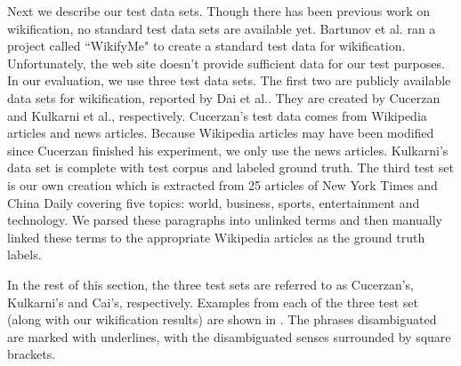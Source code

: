 Next we describe our test data sets.
Though there has been previous work on wikification,
no standard test data sets are available yet.
Bartunov et al.\cite{bartunov2011wikifyme} ran a project called
``WikifyMe" to create a standard test data for wikification.
Unfortunately, the web site doesn't provide sufficient data for our
test purposes.
In our evaluation, we use three test data sets.
The first two are publicly available data sets for wikification,
reported by Dai et al.\cite{daientity}.
They are created by Cucerzan\cite{cucerzan2007large} and
Kulkarni et al.\cite{kulkarni2009collective}, respectively.
Cucerzan's test data comes from
Wikipedia articles and news articles.
Because Wikipedia articles may have been modified
since Cucerzan finished his experiment, we only use the news articles.
Kulkarni's data set is complete with test corpus and labeled ground
truth.  The third test set is our own creation which is extracted from
25 articles of New York Times and China Daily covering five topics:
world, business, sports, entertainment and technology.
We parsed these paragraphs into unlinked terms and then
manually linked these terms to the appropriate Wikipedia articles
as the ground truth labels.

In the rest of this section, the three test sets are referred to as
Cucerzan's, Kulkarni's and Cai's, respectively. Examples from each of the three
test set (along with our wikification results) are shown in
. The phrases disambiguated
are marked with underlines, with the disambiguated senses surrounded
by square brackets.

%

